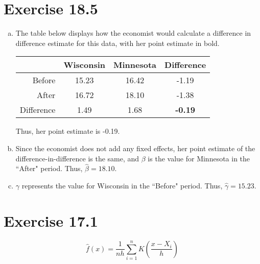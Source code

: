 \documentclass{article}
\newcommand{\bhat}{\hat{\beta}}
\begin{document}

\section*{Exercise 18.5}

\begin{enumerate}[(a)]
	\item The table below displays how the economist would calculate a difference in difference estimate for this data, with her point estimate in bold.
		\begin{center}
			\begin{tabular}{r|cc|c}
						& Wisconsin	& Minnesota & Difference	\\\hline 
			Before		& 15.23		& 16.42		& -1.19			\\
			After		& 16.72		& 18.10		& -1.38			\\\hline 
			Difference 	& 1.49		& 1.68		& \textbf{-0.19}
			\end{tabular}
		\end{center}
		Thus, her point estimate is -0.19.
	
	\item Since the economist does not add any fixed effects, her point estimate of the difference-in-difference is the same, and $\beta$ is the value for Minnesota in the ``After" period. Thus, ${\bhat=18.10}$.
	
	\item $\gamma$ represents the value for Wisconsin in the ``Before" period. Thus, ${\hat{\gamma}=15.23}$.
	
\end{enumerate}

\pagebreak
\section*{Exercise 17.1}

$$ \hat{f}(x) = \frac{1}{nh}\sum_{i=1}^n K\left(\frac{x-X_i}{h}\right) $$
\end{document}
